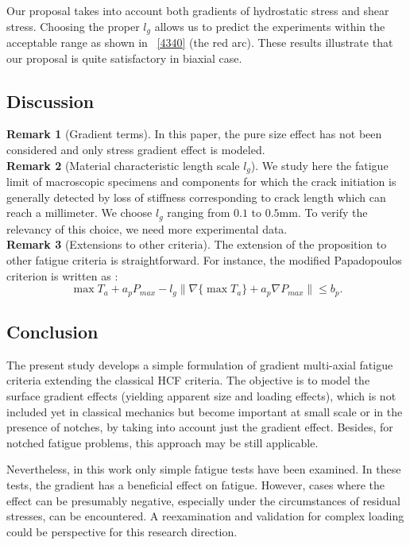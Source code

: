 \documentclass[3p,times,procedia,number]{elsarticle}
\newcommand{\figref}[1]{\figurename~\ref{#1}}
\begin{document}
Our proposal takes into account both gradients of hydrostatic stress and shear stress. Choosing the proper $l_g$ allows us to predict the experiments within the acceptable range as shown in \figref{4340} (the red arc). These results illustrate that our proposal is quite satisfactory in biaxial case.

\newpage
\subsection{Discussion}
\noindent\textbf{Remark 1} (Gradient terms). In this paper, the pure size effect has not been considered and only stress gradient effect is modeled. \vspace{6pt} \\
\textbf{Remark 2} (Material characteristic length scale $l_g$). We study here the fatigue limit of macroscopic specimens and components for which the crack initiation is generally detected by loss of stiffness corresponding to crack length which can reach a millimeter. We choose $l_g$ ranging from $0.1$ to $0.5$mm. To verify the relevancy of this choice, we need more experimental data.\vspace{6pt} \\
\textbf{Remark 3} (Extensions to other criteria). The extension of the proposition to other fatigue criteria is straightforward. For instance, the modified Papadopoulos criterion \cite{papadopoulos2001long} is written as :
\begin{equation}
\max{T_a}+a_p P_{max}- l_g \parallel{\nabla\{\max{T_a}\}}+a_p\nabla{P_{max}}\parallel\leqslant b_p .
\label{modified papa}
\end{equation}


\subsection{Conclusion}

The present study develops a simple formulation of gradient
multi-axial fatigue criteria extending the classical HCF criteria.
The objective is to model the surface gradient effects (yielding
apparent size and loading effects), which is not included yet in classical mechanics but become important at small scale or in the presence of notches, by taking into account just the gradient effect.  Besides, for notched fatigue problems, this approach may be still applicable.

Nevertheless, in this work only simple fatigue tests have been examined. In these tests, the gradient has a beneficial effect on fatigue. However, cases where the effect can be presumably negative, especially under the circumstances of residual stresses, can be encountered. A reexamination and validation for complex loading could be perspective for this research direction. 
\end{document}
